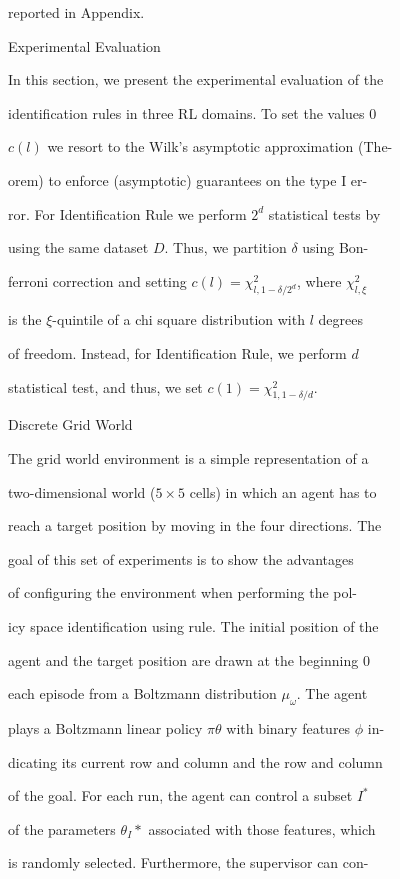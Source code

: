\documentclass[a4paper,12pt]{article}
\begin{document}
reported in Appendix.

Experimental Evaluation

In this section, we present the experimental evaluation of the

identification rules in three RL domains. To set the values $0$

$c(l)$ we resort to the Wilk's asymptotic approximation (The-

orem) to enforce (asymptotic) guarantees on the type I er-

ror. For Identification Rule we perform $2^{d}$ statistical tests by

using the same dataset $D$. Thus, we partition $\delta$ using Bon-

ferroni correction and setting $c(l) = \chi_{l,1-\delta/2^{d}}^{2}$, where $\chi_{l,\xi}^{2}$

is the $\xi$-quintile of a chi square distribution with $l$ degrees

of freedom. Instead, for Identification Rule, we perform $d$

statistical test, and thus, we set $c(1) =\chi_{1,1-\delta/d}^{2}.$

Discrete Grid World

The grid world environment is a simple representation of a

two-dimensional world ($5\times 5$ cells) in which an agent has to

reach a target position by moving in the four directions. The

goal of this set of experiments is to show the advantages

of configuring the environment when performing the pol-

icy space identification using rule. The initial position of the

agent and the target position are drawn at the beginning $0$

each episode from a Boltzmann distribution $\mu_{\omega}$. The agent

plays a Boltzmann linear policy $\pi\theta$ with binary features $\phi$ in-

dicating its current row and column and the row and column

of the goal. For each run, the agent can control a subset $I^{*}$

of the parameters $\theta_{I}*$ associated with those features, which

is randomly selected. Furthermore, the supervisor can con-
\end{document}
